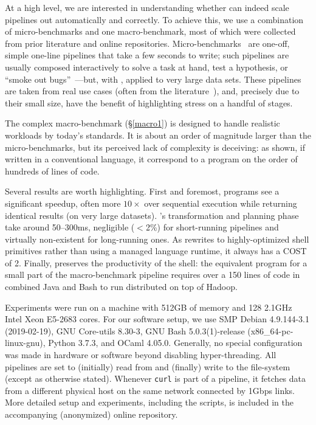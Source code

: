 \documentclass[sigplan,10pt,review,anonymous]{acmart}
\newcommand{\ttt}[1]{\texttt{\small #1}}
\newcommand{\wkq}{\ttt{q\textsubscript{1-4}}}
\newcommand{\todo}[1]{\hl{#1}\xspace}
\begin{document}
At a high level, we are interested in understanding whether \sys can indeed scale pipelines out automatically and correctly.
To achieve this, we use a combination of micro-bench\-marks and one macro-bench\-mark, most of which were collected from prior literature and online repositories.
Micro-bench\-marks~ are one-off, simple one-line pipelines that take a few seconds to write;
  such pipelines are usually composed interactively to solve a task at hand, test a hypothesis, or ``smoke out bugs''~\cite{bentley1986literate}---but, with \sys, applied to very large data sets.
These pipelines are taken from real use cases (often from the literature~\cite{bentley1985spelling}), and, precisely due to their small size, have the benefit of highlighting stress on a handful of stages.

The complex macro-benchmark (\S\ref{macro1}) is designed to handle realistic workloads by today's standards.
It is about an order of magnitude larger than the micro-benchmarks, but its perceived lack of complexity is deceiving:
  as shown, if written in a conventional language, it correspond to a program on the order of hundreds of lines of code.

Several results are worth highlighting.
First and foremost, programs see a significant speedup, often more $10\times$ over sequential execution  while returning identical results (on very large datasets).
\sys's transformation and planning phase take around 50--300ms, negligible ($<$2\%) for short-running pipelines and virtually non-existent for long-running ones.
As \sys rewrites to highly-optimized shell primitives rather than using a managed language runtime, it always has a COST~\cite{mcsherryscalability} of 2.
Finally, \sys preserves the productivity of the shell:
  the equivalent program for a small part of the macro-benchmark pipeline requires over a 150 lines of code in combined Java and Bash to run distributed on top of Hadoop.

Experiments were run on a %
 machine with 512GB of memory and 128 2.1GHz Intel Xeon E5-2683 cores.
For our software setup, we use SMP Debian 4.9.144-3.1 (2019-02-19), GNU Core-utils 8.30-3, GNU Bash 5.0.3(1)-release (x86\_64-pc-linux-gnu), Python 3.7.3, and OCaml 4.05.0.
Generally, no special configuration was made in hardware or software beyond disabling hyper-threading. %
All pipelines are set to (initially) read from and (finally) write to the file-system (except as otherwise stated).
Whenever \ttt{curl} is part of a pipeline, it fetches data from a different physical host on the same network connected by 1Gbps links.
More detailed setup and experiments, including the scripts, is included in the accompanying (anonymized) online repository.
\end{document}
